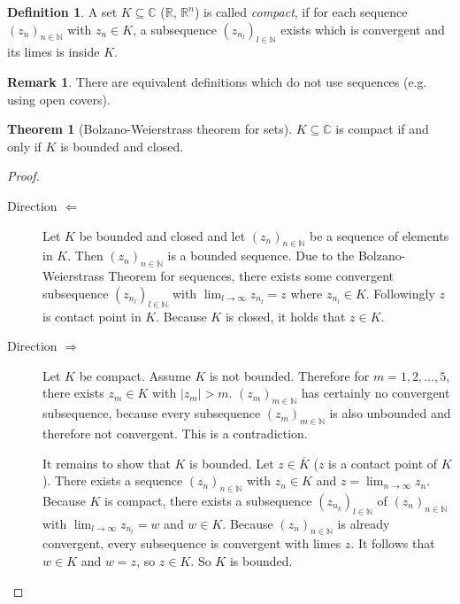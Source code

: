 \documentclass[a4paper,landscape,twocolumn]{article}
\theoremstyle{definition}
\newtheorem{theorem}{Theorem}
\newtheorem{defi}{Definition}
\newtheorem{rem}{Remark}
\newcommand\abs[1]{\left|#1\right|}
\newcommand\seq[1]{{\left(#1\right)}_{n \in \mathbb N}}
\begin{document}
\begin{defi}
  A set $K \subseteq \mathbb C$ ($\mathbb R$, $\mathbb R^n$) is called \emph{compact},
  if for each sequence $\seq{z_n}$ with $z_n \in K$,
  a subsequence $\left(z_{n_l}\right)_{l \in \mathbb N}$
  exists which is convergent and its limes is inside $K$.
\end{defi}
%
\begin{rem}
  There are equivalent definitions which do not use sequences (e.g. using open covers).
\end{rem}
%
\begin{theorem}[Bolzano-Weierstrass theorem for sets]
  $K \subseteq \mathbb C$ is compact if and only if $K$ is bounded and closed.
\end{theorem}
\begin{proof}
  \begin{description}
    \item[Direction $\Leftarrow$]
      Let $K$ be bounded and closed and let $\seq{z_n}$ be a sequence of elements
      in $K$. Then $\seq{z_n}$ is a bounded sequence. Due to the Bolzano-Weierstrass
      Theorem for sequences, there exists some convergent subsequence
      $\left(z_{n_l}\right)_{l \in \mathbb N}$ with $\lim_{l\to\infty} z_{n_l} = z$
      where $z_{n_l} \in K$. Followingly $z$ is contact point in $K$.
      Because $K$ is closed, it holds that $z \in K$.
    \item[Direction $\Rightarrow$]
      Let $K$ be compact. Assume $K$ is not bounded.
      Therefore for $m = 1, 2, \dots, 5$, there exists $z_m \in K$ with $\abs{z_m} > m$.
      $\left(z_m\right)_{m\in\mathbb N}$ has certainly no convergent subsequence, because
      every subsequence $\left(z_m\right)_{m\in\mathbb N}$ is also unbounded and
      therefore not convergent. This is a contradiction.

      It remains to show that $K$ is bounded. Let $z \in \overline{K}$ ($z$ is a contact point of $K$).
      There exists a sequence $\seq{z_n}$ with $z_n \in K$ and $z = \lim_{n\to\infty} z_n$.
      Because $K$ is compact, there exists a subsequence $\left(z_{n_k}\right)_{l\in\mathbb N}$ of
      $\seq{z_n}$ with $\lim_{l\to\infty} z_{n_l} = w$ and $w \in K$.
      Because $\seq{z_n}$ is already convergent, every subsequence is convergent
      with limes $z$.
      It follows that $w \in K$ and $w = z$, so $z \in K$. So $K$ is bounded.
  \end{description}
\end{proof}
\end{document}
